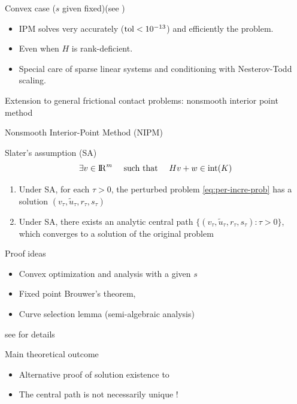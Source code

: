 \begin{frame}
    \begin{block}{Convex case ($s$ given  fixed)(see \cite{acary:hal-03913568})}
      \begin{itemize}
      \item IPM solves very accurately (${\rm tol}< 10^{-13}$) and efficiently the problem.
      \item Even when $H$ is rank-deficient. 
      \item Special care of sparse linear systems and conditioning with Nesterov-Todd scaling.
      \end{itemize}
      
    \end{block}
   Extension to general frictional contact problems: nonsmooth interior point method

  
\end{frame}

\begin{frame}{Nonsmooth Interior-Point Method (NIPM)}
  \begin{block}{Slater's assumption (SA)}
    $$\exists v \in \mathrm{I\!R}^m \quad \text{ such that } \quad Hv+w \in \mbox{int}({K})$$
    \vspace{-12pt}
  \end{block}
    \begin{theorem}
        \begin{enumerate}
            \item Under SA, for each $\tau > 0$, the perturbed problem \eqref{eq:per-incre-prob} has a solution $(v_\tau,\tilde{u}_\tau,r_\tau,s_\tau)$ \\[6pt]
            \item Under SA, there exists an analytic central path $\{(v_\tau,\tilde{u}_\tau,r_\tau,s_\tau): \tau>0\}$, which converges to a solution of the original problem
        \end{enumerate}
      \end{theorem}
      \begin{block}{Proof ideas}
        \begin{itemize}
        \item Convex optimization and analysis with a given $s$
        \item Fixed point  Brouwer's theorem,
        \item Curve selection lemma (semi-algebraic analysis)
        \end{itemize}
      \end{block}
      see \citep{acary:hal-05551912} for details
      \begin{block}{Main theoretical outcome}
        \begin{itemize}
        \item Alternative proof of solution existence to~\citep{Cadoux2009,Acary.ea_ZAMM2011}
        \item The central path is not necessarily unique !
        \end{itemize}
      \end{block}
\end{frame}


